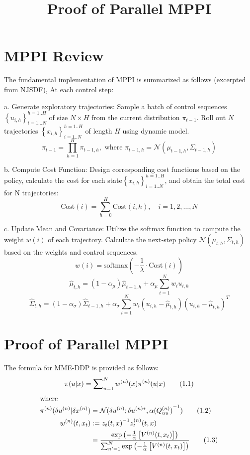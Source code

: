 \documentclass{article}
\begin{document}
\title{Proof of Parallel MPPI}
\maketitle

\section{MPPI Review}
The fundamental implementation of MPPI is summarized as follows (excerpted from NJSDF), At each control step:

a. Generate exploratory trajectories: Sample a batch of control sequences \(\left\{u_{i, h}\right\}_{i=1 . . . N}^{h=1 . . H}\) of size \(N \times H\) from the current distribution \(\pi_{t-1}\). Roll out \(N\) trajectories \(\left\{x_{i, h}\right\}_{i=1 . . N}^{h=1 . . H}\) of length \(H\) using dynamic model. 
\[
\pi_{t-1} = \prod_{h=1}^{H} \pi_{t-1, h}, \text{ where } \pi_{t-1, h} = \mathcal{N}(\mu_{t-1, h}, \Sigma_{t-1, h}) \tag{1}
\]

b. Compute Cost Function: Design corresponding cost functions based on the policy, calculate the cost for each state\(\left\{x_{i, h}\right\}_{i=1 . . N}^{h=1 . . H}\), and obtain the total cost for N trajectories: \\
\[
\text{Cost}(i) = \sum_{h=0}^{H} \text{Cost}(i, h), \quad i=1,2, \ldots, N  \tag{2}
\]

c. Update Mean and Covariance: Utilize the softmax function to compute the weight \(w(i)\) of each trajectory. Calculate the next-step policy \( \mathcal{N}(\mu_{t, h}, \Sigma_{t, h}) \) based on the weights and control sequences.
\[w(i) = \text{softmax}\left(-\frac{1}{\lambda} \cdot \text{Cost}(i)\right) \tag{3}\]
\[\hat{\mu}_{t, h} = (1-\alpha_{\mu}) \hat{\mu}_{t-1, h} + \alpha_{\mu} \sum_{i=1}^{N} w_{i} u_{i, h} \tag{4}\]
\[\hat{\Sigma}_{t, h} = (1-\alpha_{\sigma}) \hat{\Sigma}_{t-1, h} + \alpha_{\sigma} \sum_{i=1}^{N} w_{i}(u_{i, h}-\hat{\mu}_{t, h})(u_{i, h}-\hat{\mu}_{t, h})^{T} \tag{5}\]


\section{Proof of Parallel MPPI}

The formula for MME-DDP is provided as follows:
\[\pi (u|x)=\sum\nolimits_{n=1}^{N}{{{w}^{(n)}}}(x){{\pi }^{(n)}}(u|x) \tag{1.1}\\ \]
\begin{align} 
	\intertext{where}
	{{\pi }^{(n)}}(\delta {{u}^{(n)}}|\delta {{x}^{(n)}})&=\mathcal{N}(\delta {{u}^{(n)}};\delta {{u}^{(n)*}},\alpha {{(Q_{uu}^{(n)})}^{-1}}) \tag{1.2} \\ 
	\nonumber {{w}^{(n)}}(t,{{x}_{t}})&\mathrel{:=}{{z}_{t}}{{(t,x)}^{-1}}z_{t}^{(n)}(t,x) \\ 
	& =\frac{\exp \left( -\frac{1}{\alpha }\left[ {{V}^{(n)}}(t,{{x}_{t}}) \right] \right)}{\sum\nolimits_{{{n}^{\prime }}=1}^{N}{\exp }\left( -\frac{1}{\alpha }\left[ {{V}^{(n)}}(t,{{x}_{t}}) \right] \right)} \tag{1.3}
\end{align}
\end{document}

